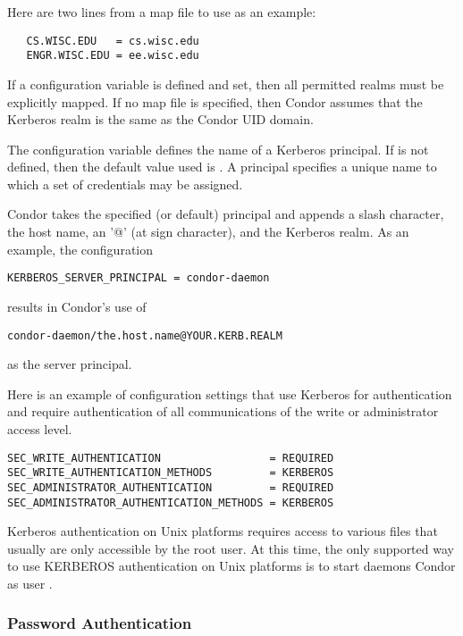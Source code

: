 Here are two lines from a map file to use as an example:
\begin{verbatim}
   CS.WISC.EDU   = cs.wisc.edu
   ENGR.WISC.EDU = ee.wisc.edu
\end{verbatim}

If a 
configuration variable is defined and set,
then all permitted realms must be explicitly mapped.
If no map file is specified, then Condor assumes that the
Kerberos realm is the same as the Condor UID domain.

The configuration variable
defines the name of a Kerberos principal.
If  is not defined,
then the default value used is \verb@host@.
A principal specifies a unique name to which a set of credentials
may be assigned.

Condor takes the specified (or default) principal and appends
a slash character, the host name, an '@' (at sign character),
and the Kerberos realm.
As an example, the configuration
\begin{verbatim}
KERBEROS_SERVER_PRINCIPAL = condor-daemon
\end{verbatim}
results in Condor's use of
\begin{verbatim}
condor-daemon/the.host.name@YOUR.KERB.REALM
\end{verbatim}
as the server principal.

Here is
an example of configuration settings that use Kerberos for
authentication and require authentication of all communications
of the write or administrator access level.
\footnotesize
\begin{verbatim}
SEC_WRITE_AUTHENTICATION                 = REQUIRED
SEC_WRITE_AUTHENTICATION_METHODS         = KERBEROS
SEC_ADMINISTRATOR_AUTHENTICATION         = REQUIRED
SEC_ADMINISTRATOR_AUTHENTICATION_METHODS = KERBEROS
\end{verbatim}
\normalsize

Kerberos authentication on Unix platforms
requires access to various files that
usually are only accessible by the root user.
At this time,
the only supported way to use KERBEROS authentication on Unix platforms
is to start daemons Condor as user .

\subsubsection{\label{sec:Password-Authentication} Password Authentication}

